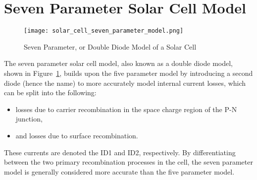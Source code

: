 \section{Seven Parameter Solar Cell Model}\label{sec:seven_parameter_solar_cell_model}


\begin{figure}[h]
    \texttt{[image: solar\_cell\_seven\_parameter\_model.png]}
    \caption{Seven Parameter, or Double Diode Model of a Solar Cell}
    \label{fig:double_diode_model}
\end{figure}

The seven parameter solar cell model, also known as a double diode model, shown
in Figure~\ref{fig:double_diode_model}, builds upon the five parameter model by
introducing a second diode (hence the name) to more accurately model internal
current losses, which can be split into the following:

\begin{itemize}
    \item losses due to carrier recombination in the space charge region of the
    P-N junction,
    \item and losses due to surface recombination.
\end{itemize}

These currents are denoted the \ac{ID1} and \ac{ID2}, respectively. By
differentiating between the two primary recombination processes in the cell, the
seven parameter model is generally considered more accurate than the five
parameter model.
